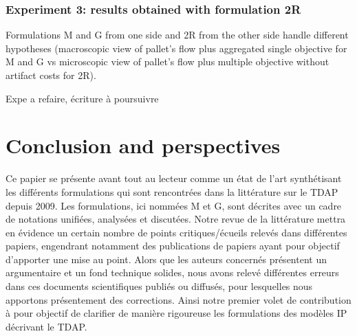 \documentclass[preprint,12pt,authoryear]{elsarticle}
\begin{document}
%
%
\subsubsection{Experiment 3: results obtained with formulation 2R}\label{sec:res2R}

\color{red}

Formulations M and G from one side and 2R from the other side handle different hypotheses 
(macroscopic view of pallet's flow plus aggregated single objective for M and G vs microscopic view of pallet's flow plus multiple objective without artifact costs for 2R).

Expe a refaire, écriture à poursuivre
\color{black}

%
%
\section{Conclusion and perspectives} 
\label{sec:ConclusionPerspectives}

\color{red}
Ce papier se présente avant tout au lecteur comme un état de l’art synthétisant  les différents formulations qui sont rencontrées dans la littérature sur le TDAP depuis 2009. 
Les formulations, ici nommées M et G, sont décrites avec un cadre de notations unifiées, analysées et discutées.
%
Notre revue de la littérature mettra en évidence un certain nombre de points critiques/écueils relevés dans différentes papiers, engendrant notamment des publications de papiers  ayant pour objectif d'apporter une mise au point.
Alors que les auteurs concernés présentent un argumentaire et un fond technique solides, nous avons relevé différentes erreurs dans ces documents scientifiques publiés ou diffusés, pour lesquelles nous apportons présentement des corrections.
Ainsi notre premier volet de contribution à pour objectif de clarifier de manière rigoureuse les formulations des modèles IP décrivant le TDAP.
\end{document}
